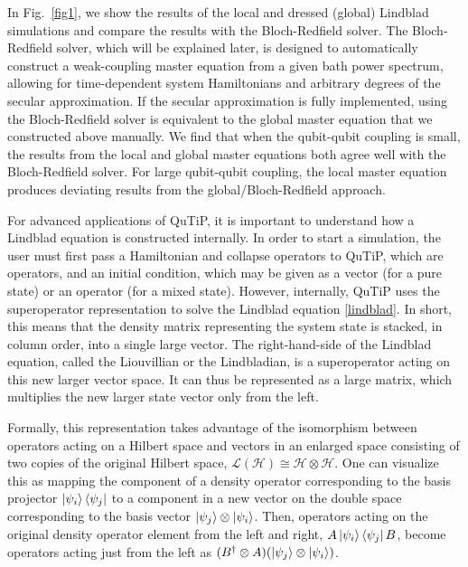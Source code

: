 \documentclass[preprint,3p,sort&compress]{elsarticle}
\newcommand{\fig}[1]{Fig.~\ref{#1}}
\begin{document}
%
In \fig{fig1}, we show the results of the local and dressed (global) Lindblad simulations and compare the results with the Bloch-Redfield solver.
The Bloch-Redfield solver, which will be explained later, is designed to automatically construct a weak-coupling master equation from a given bath power spectrum, allowing for time-dependent system Hamiltonians and arbitrary degrees of the secular approximation. If the secular approximation is fully implemented, using the Bloch-Redfield solver is equivalent to the global master equation that we constructed above manually.
We find that when the qubit-qubit coupling is small, the results from the local and global master equations both agree well with the Bloch-Redfield solver. For large qubit-qubit coupling,  the local master equation produces deviating results from the global/Bloch-Redfield approach.




For advanced applications of QuTiP, it is important to understand how a Lindblad equation is constructed internally.  In order to start a simulation, the user must first pass a Hamiltonian and collapse operators to QuTiP, which are operators, and an initial condition, which may be given as a vector (for a pure state) or an operator (for a mixed state).
However, internally, QuTiP uses the superoperator representation to solve the Lindblad equation \eqref{lindblad}.  In short, this means that the density matrix representing the system state is stacked, in column order, into a single large vector.  The right-hand-side of the Lindblad equation, called the Liouvillian or the Lindbladian, is a superoperator acting on this new larger vector space. It can thus be represented as a large matrix, which multiplies the new larger state vector only from the left. 

Formally, this representation takes advantage of the isomorphism between operators acting on a Hilbert space and vectors in an enlarged space consisting of two copies of the original Hilbert space, $\mathcal{L}(\mathcal{H}) \cong \mathcal{H} \otimes \mathcal{H}$.  One can visualize this as mapping the component of a density operator corresponding to the basis projector $\ket{\psi_i} \bra{\psi_j}$ to a component in a new vector on the double space corresponding to the basis vector $\ket{\psi_j}\otimes \ket{\psi_i}$.  Then, operators acting on the original density operator element from the left and right, $A \ket{\psi_i} \bra{\psi_j} B$, become operators acting just from the left as $(B^{\dagger} \otimes A) (\ket{\psi_j}\otimes \ket{\psi_i})$.  
\end{document}
